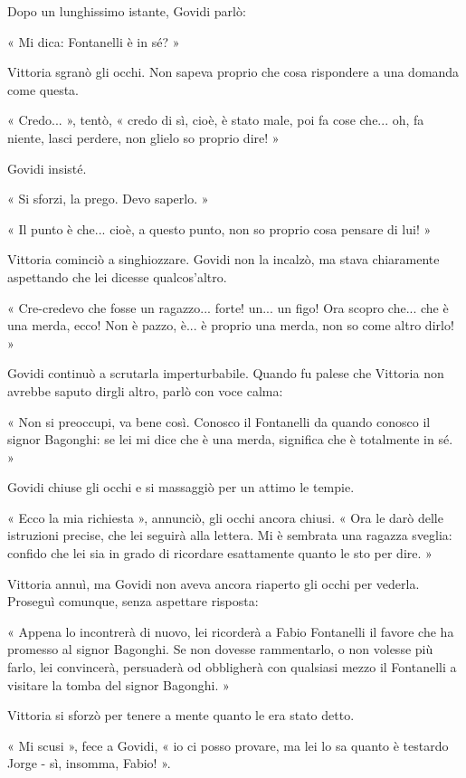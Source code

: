 Dopo un lunghissimo istante, Govidi parlò:

« Mi dica: Fontanelli è in sé? »

Vittoria sgranò gli occhi. Non sapeva proprio che cosa rispondere a una domanda come questa.

« Credo... », tentò, « credo di sì, cioè, è stato male, poi fa cose che... oh, fa niente, lasci perdere, non glielo so proprio dire! »

Govidi insisté.

« Si sforzi, la prego. Devo saperlo. »

« Il punto è che... cioè, a questo punto, non so proprio cosa pensare di lui! »

Vittoria cominciò a singhiozzare. Govidi non la incalzò, ma stava chiaramente aspettando che lei dicesse qualcos'altro.

« Cre-credevo che fosse un ragazzo... forte! un... un figo! Ora scopro che... che è una merda, ecco! Non è pazzo, è... è proprio una merda, non so come altro dirlo! »

Govidi continuò a scrutarla imperturbabile. Quando fu palese che Vittoria non avrebbe saputo dirgli altro, parlò con voce calma:

« Non si preoccupi, va bene così. Conosco il Fontanelli da quando conosco il signor Bagonghi: se lei mi dice che è una merda, significa che è totalmente in sé. »

Govidi chiuse gli occhi e si massaggiò per un attimo le tempie.

« Ecco la mia richiesta », annunciò, gli occhi ancora chiusi. « Ora le darò delle istruzioni precise, che lei seguirà alla lettera. Mi è sembrata una ragazza sveglia: confido che lei sia in grado di ricordare esattamente quanto le sto per dire. »

Vittoria annuì, ma Govidi non aveva ancora riaperto gli occhi per vederla. Proseguì comunque, senza aspettare risposta:

« Appena lo incontrerà di nuovo, lei ricorderà a Fabio Fontanelli il favore che ha promesso al signor Bagonghi. Se non dovesse rammentarlo, o non volesse più farlo,  lei convincerà, persuaderà od obbligherà con qualsiasi mezzo il Fontanelli a visitare la tomba del signor Bagonghi. »

Vittoria si sforzò per tenere a mente quanto le era stato detto.

« Mi scusi », fece a Govidi, « io ci posso provare, ma lei lo sa quanto è testardo Jorge - sì, insomma, Fabio! ».

